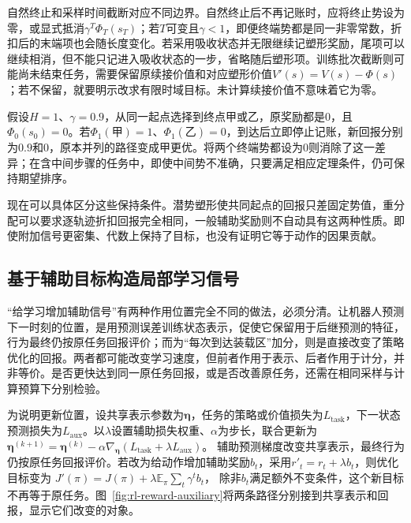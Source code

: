 自然终止和采样时间截断对应不同边界。自然终止后不再记账时，应将终止势设为零，或显式抵消$\gamma^T\Phi_T(s_T)$；若$T$可变且$\gamma<1$，即便终端势都是同一非零常数，折扣后的末端项也会随长度变化。若采用吸收状态并无限继续记塑形奖励，尾项可以继续相消，但不能只记进入吸收状态的一步，省略随后塑形项。训练批次截断则可能尚未结束任务，需要保留原续接价值和对应塑形价值$V'(s)=V(s)-\Phi(s)$；若不保留，就要明示改求有限时域目标。未计算续接价值不意味着它为零。

\begin{example}[遗漏终端势会改变排序]
  \label{ex:rl-reward-terminal}
  假设$H=1$、$\gamma=0.9$，从同一起点选择到终点甲或乙，原奖励都是0，且$\Phi_0(s_0)=0$。若$\Phi_1(\text{甲})=1$、$\Phi_1(\text{乙})=0$，到达后立即停止记账，新回报分别为$0.9$和0，原本并列的路径变成甲更优。将两个终端势都设为0则消除了这一差异；在含中间步骤的任务中，即使中间势不准确，只要满足相应定理条件，仍可保持期望排序。
\end{example}

现在可以具体区分这些保持条件。潜势塑形使共同起点的回报只差固定势值，重分配可以要求逐轨迹折扣回报完全相同，一般辅助奖励则不自动具有这两种性质。即使附加信号更密集、代数上保持了目标，也没有证明它等于动作的因果贡献。

\subsection{基于辅助目标构造局部学习信号}
\label{sec:rl-reward-auxiliary}

“给学习增加辅助信号”有两种作用位置完全不同的做法，必须分清。让机器人预测下一时刻的位置，是用预测误差训练状态表示，促使它保留用于后继预测的特征，行为最终仍按原任务回报评价；而为“每次到达装载区”加分，则是直接改变了策略优化的回报。两者都可能改变学习速度，但前者作用于表示、后者作用于计分，并非等价。是否更快达到同一原任务回报，或是否改善原任务，还需在相同采样与计算预算下分别检验。

为说明更新位置，设共享表示参数为$\bm{\eta}$，任务的策略或价值损失为$L_{\mathrm{task}}$，下一状态预测损失为$L_{\mathrm{aux}}$。以$\lambda$设置辅助损失权重、$\alpha$为步长，联合更新为
$\bm{\eta}^{(k+1)}=\bm{\eta}^{(k)}
-\alpha\nabla_{\bm{\eta}}(L_{\mathrm{task}}+\lambda L_{\mathrm{aux}})$。
辅助预测梯度改变共享表示，最终行为仍按原任务回报评价。若改为给动作增加辅助奖励$b_t$，采用$r'_t=r_t+\lambda b_t$，则优化目标变为
$J'(\pi)=J(\pi)+\lambda\mathbb E_\pi\sum_t\gamma^t b_t$，
除非$b_t$满足额外不变条件，这个新目标不再等于原任务。图~\ref{fig:rl-reward-auxiliary}将两条路径分别接到共享表示和回报，显示它们改变的对象。

